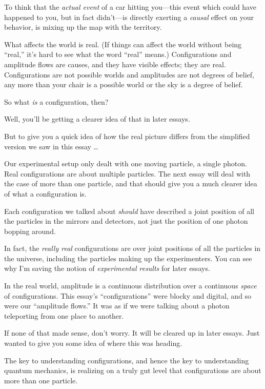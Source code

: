 {
 To think that the \textit{actual event} of a car hitting
you---this event which could have happened to you, but in fact
didn't---is directly exerting a \textit{causal} effect
on your behavior, is mixing up the map with the territory.}

{
 What affects the world is real. (If things can affect the world
without being ``real,''
it's hard to see what the word
``real'' means.) Configurations and
amplitude flows are causes, and they have visible effects; they are
real. Configurations are not possible worlds and amplitudes are not
degrees of belief, any more than your chair is a possible world or the
sky is a degree of belief.}

{
 So what \textit{is} a configuration, then?}

{
 Well, you'll be getting a clearer idea of that in
later essays.}

{
 But to give you a quick idea of how the real picture differs from
the simplified version we saw in this essay \ldots}

{
 Our experimental setup only dealt with one moving particle, a
single photon. Real configurations are about multiple particles. The
next essay will deal with the case of more than one particle, and that
should give you a much clearer idea of what a configuration is.}

{
 Each configuration we talked about \textit{should} have described
a joint position of all the particles in the mirrors and detectors, not
just the position of one photon bopping around.}

{
 In fact, the \textit{really real} configurations are over joint
positions of all the particles in the universe, including the particles
making up the experimenters. You can see why I'm saving
the notion of \textit{experimental results} for later essays.}

{
 In the real world, amplitude is a continuous distribution over a
continuous \textit{space} of configurations. This
essay's
``configurations'' were blocky and
digital, and so were our ``amplitude
flows.'' It was as if we were talking about a photon
teleporting from one place to another.}

{
 If none of that made sense, don't worry. It will
be cleared up in later essays. Just wanted to give you some idea of
where this was heading.}

\myendsectiontext



{
 The key to understanding configurations, and hence the key to
understanding quantum mechanics, is realizing on a truly gut level that
configurations are about more than one particle.}

